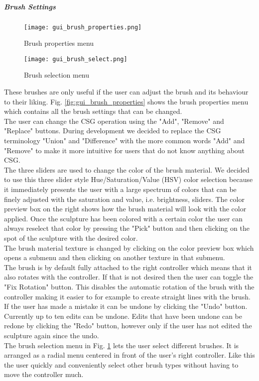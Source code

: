 \subparagraph{Brush Settings}

\begin{figure}[!htb]
\texttt{[image: gui\_brush\_properties.png]}
\caption{Brush properties menu}
\label{fig:gui_brush_properties}
\endminipage\hfill
{}
\texttt{[image: gui\_brush\_select.png]}
\caption{Brush selection menu}
\label{fig:gui_brush_select}
\endminipage\hfill
\end{figure}

These brushes are only useful if the user can adjust the brush and its behaviour to their liking. Fig. \ref{fig:gui_brush_properties} shows the brush properties menu which contains all the brush settings that can be changed.\\
The user can change the CSG operation using the "Add", "Remove" and "Replace" buttons. During development we decided to replace the CSG terminology "Union" and "Difference" with the more common words "Add" and "Remove" to make it more intuitive for users that do not know anything about CSG.\\
The three sliders are used to change the color of the brush material. We decided to use this three slider style Hue/Saturation/Value (HSV) color selection because it immediately presents the user with a large spectrum of colors that can be finely adjusted with the saturation and value, i.e. brightness, sliders. The color preview box on the right shows how the brush material will look with the color applied. Once the sculpture has been colored with a certain color the user can always reselect that color by pressing the "Pick" button and then clicking on the spot of the sculpture with the desired color.\\
The brush material texture is changed by clicking on the color preview box which opens a submenu and then clicking on another texture in that submenu.\\
The brush is by default fully attached to the right controller which means that it also rotates with the controller. If that is not desired then the user can toggle the
"Fix Rotation" button. This disables the automatic rotation of the brush with the controller making it easier to for example to create straight lines with the brush.\\
If the user has made a mistake it can be undone by clicking the "Undo" button. Currently up to ten edits can be undone. Edits that have been undone can be redone by clicking the "Redo" button, however only if the user has not edited the sculpture again since the undo.\\
The brush selection menu in Fig. \ref{fig:gui_brush_select} lets the user select different brushes. It is arranged as a radial menu centered in front of the user's right controller. Like this the user quickly and conveniently select other brush types without having to move the controller much.

